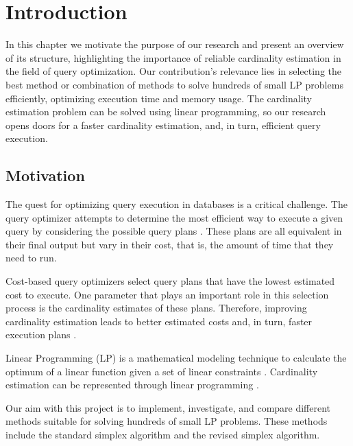 

 \chapter{Introduction}\label{chapter:introduction}
 In this chapter we motivate the purpose of our research and present an overview of its structure, highlighting the importance of reliable cardinality estimation in the field of query optimization. Our contribution's relevance lies in selecting the best method or combination of methods to solve hundreds of small LP problems efficiently, optimizing execution time and memory usage. The cardinality estimation problem can be solved using linear programming, so our research opens doors for a faster cardinality estimation, and, in turn, efficient query execution.
 
 \section{Motivation}
 
 The quest for optimizing query execution in databases is a critical
 challenge. The query optimizer attempts 
 to determine the most efficient way to execute a given query by considering the possible 
 query plans \parencite{leis2018query}. 
 These plans are all equivalent in their final output but vary in their
 cost, that is, the amount of time that they need to run.
 
 Cost-based query optimizers select query plans that have the lowest estimated cost to
 execute. One parameter that plays an important role in this selection process 
 is the cardinality estimates 
 of these plans. Therefore, improving cardinality estimation leads to better estimated costs 
 and, in turn, faster execution plans \parencite{graefe1993volcano}.
 
 Linear Programming (LP) is a mathematical modeling technique to calculate the optimum of a linear function
 given a set of linear constraints \parencite{chvatal1983linear}.
 Cardinality estimation can be represented through linear programming \parencite{atserias2013size}.
 
 Our aim with this project is to implement, 
 investigate, and compare different methods suitable for solving hundreds of small LP 
 problems. These methods include the standard simplex algorithm and the revised simplex algorithm.

